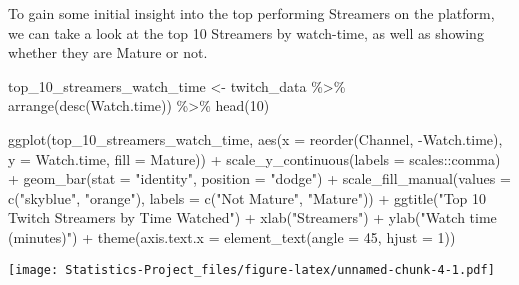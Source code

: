 \documentclass[
]{article}
\newenvironment{Shaded}{\begin{snugshade}}{\end{snugshade}}
\newcommand{\AttributeTok}[1]{\textcolor[rgb]{0.77,0.63,0.00}{#1}}
\newcommand{\DecValTok}[1]{\textcolor[rgb]{0.00,0.00,0.81}{#1}}
\newcommand{\FunctionTok}[1]{\textcolor[rgb]{0.00,0.00,0.00}{#1}}
\newcommand{\NormalTok}[1]{#1}
\newcommand{\OtherTok}[1]{\textcolor[rgb]{0.56,0.35,0.01}{#1}}
\newcommand{\SpecialCharTok}[1]{\textcolor[rgb]{0.00,0.00,0.00}{#1}}
\newcommand{\StringTok}[1]{\textcolor[rgb]{0.31,0.60,0.02}{#1}}
\begin{document}
To gain some initial insight into the top performing Streamers on the
platform, we can take a look at the top 10 Streamers by watch-time, as
well as showing whether they are Mature or not.

\begin{Shaded}
\begin{Highlighting}[]
\NormalTok{top\_10\_streamers\_watch\_time }\OtherTok{\textless{}{-}}\NormalTok{ twitch\_data }\SpecialCharTok{\%\textgreater{}\%}
  \FunctionTok{arrange}\NormalTok{(}\FunctionTok{desc}\NormalTok{(Watch.time)) }\SpecialCharTok{\%\textgreater{}\%}
  \FunctionTok{head}\NormalTok{(}\DecValTok{10}\NormalTok{)}

\FunctionTok{ggplot}\NormalTok{(top\_10\_streamers\_watch\_time, }\FunctionTok{aes}\NormalTok{(}\AttributeTok{x =} \FunctionTok{reorder}\NormalTok{(Channel, }\SpecialCharTok{{-}}\NormalTok{Watch.time), }\AttributeTok{y =}\NormalTok{ Watch.time, }\AttributeTok{fill =}\NormalTok{ Mature)) }\SpecialCharTok{+}
  \FunctionTok{scale\_y\_continuous}\NormalTok{(}\AttributeTok{labels =}\NormalTok{ scales}\SpecialCharTok{::}\NormalTok{comma) }\SpecialCharTok{+}
  \FunctionTok{geom\_bar}\NormalTok{(}\AttributeTok{stat =} \StringTok{"identity"}\NormalTok{, }\AttributeTok{position =} \StringTok{"dodge"}\NormalTok{) }\SpecialCharTok{+}
  \FunctionTok{scale\_fill\_manual}\NormalTok{(}\AttributeTok{values =} \FunctionTok{c}\NormalTok{(}\StringTok{"skyblue"}\NormalTok{, }\StringTok{"orange"}\NormalTok{), }\AttributeTok{labels =} \FunctionTok{c}\NormalTok{(}\StringTok{"Not Mature"}\NormalTok{, }\StringTok{"Mature"}\NormalTok{)) }\SpecialCharTok{+}
  \FunctionTok{ggtitle}\NormalTok{(}\StringTok{"Top 10 Twitch Streamers by Time Watched"}\NormalTok{) }\SpecialCharTok{+}
  \FunctionTok{xlab}\NormalTok{(}\StringTok{"Streamers"}\NormalTok{) }\SpecialCharTok{+}
  \FunctionTok{ylab}\NormalTok{(}\StringTok{"Watch time (minutes)"}\NormalTok{) }\SpecialCharTok{+}
  \FunctionTok{theme}\NormalTok{(}\AttributeTok{axis.text.x =} \FunctionTok{element\_text}\NormalTok{(}\AttributeTok{angle =} \DecValTok{45}\NormalTok{, }\AttributeTok{hjust =} \DecValTok{1}\NormalTok{))}
\end{Highlighting}
\end{Shaded}

\texttt{[image: Statistics-Project\_files/figure-latex/unnamed-chunk-4-1.pdf]}
\end{document}

